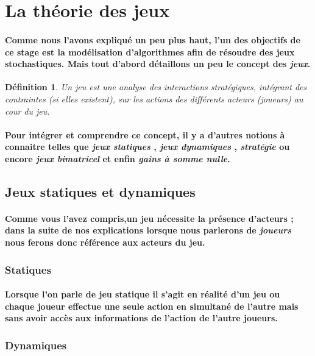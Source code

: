 \documentclass[a4paper, 12pt, twoside]{article}
\newtheorem{definition}{Définition}
\begin{document}
\section{La théorie des jeux}
\paragraph{Comme nous l'avons expliqué un peu plus haut, l'un des objectifs de ce stage est la modélisation d'algorithmes afin de résoudre des jeux stochastiques. Mais tout d'abord détaillons un peu le concept des \textit{jeux}.}
\begin{definition}
Un jeu est une analyse des interactions stratégiques, intégrant des contraintes (si elles existent), sur les actions des différents acteurs (joueurs) au cour du jeu.
\end{definition}
\paragraph{Pour intégrer et comprendre ce concept, il y a d'autres notions à connaitre telles que \textit{jeux statiques} , \textit{jeux dynamiques} , \textit{stratégie } ou encore \textit{jeux bimatricel} et enfin \textit{gains à somme nulle}.}
	
\subsection{Jeux statiques et dynamiques}
\paragraph{Comme vous l'avez compris,un jeu nécessite la présence d'acteurs ; dans la suite de nos explications lorsque nous parlerons de \textit{joueurs} nous ferons donc référence aux acteurs du jeu.}
\subsubsection{Statiques}
\paragraph{Lorsque l'on parle de jeu statique il s'agit en réalité d'un jeu ou chaque joueur effectue une seule action en simultané de l'autre mais sans avoir accès aux informations de l'action de l'autre joueurs.}
\subsubsection{Dynamiques}
\end{document}
